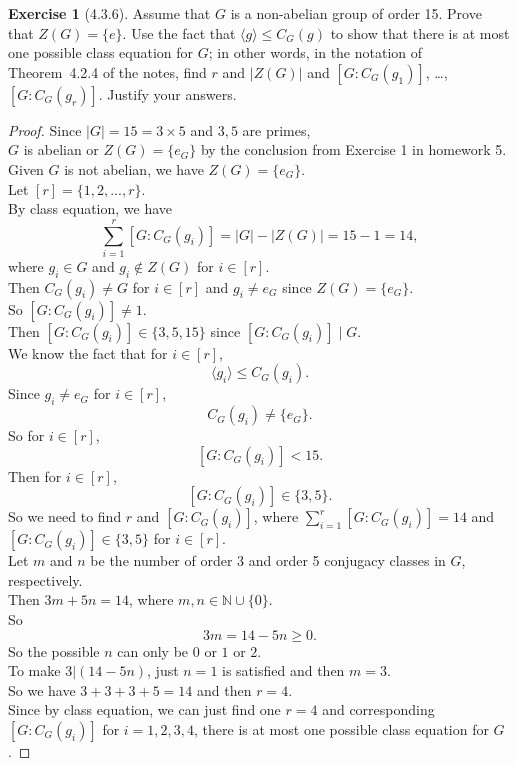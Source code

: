 \documentclass{amsart}
\newcommand{\bbn}{\mathbb{N}}
\theoremstyle{plain}
\theoremstyle{definition}
\newtheorem{exer}[lem]{Exercise}
\begin{document}
\begin{exer}[4.3.6]
Assume that $G$ is a non-abelian group of order 15. 
Prove that $Z(G)=\{e\}$. 
Use the fact that $\langle g\rangle\leq C_G(g)$ to show that there is at most one possible class equation for $G$;
in other words, in the notation of Theorem~4.2.4 of the notes, find $r$ and $|Z(G)|$ and $[G:C_G(g_1)]$, \ldots, $[G:C_G(g_r)]$.
Justify your answers.

\begin{proof}
	Since $|G| = 15 = 3 \times 5$ and $3,5$ are primes, \\
	$G$ is abelian or $Z(G)= \{e_G\}$ by the conclusion from Exercise 1 in homework 5.\\
	Given $G$ is not abelian, we have $Z(G)=\{e_G\}$.\\
	Let $[r] = \{1,2,...,r\}$.\\
	By class equation, we have 
	\[\sum_{i=1}^r [G:C_G(g_i)] = |G|-|Z(G)| = 15-1 = 14,\]
	where $g_i \in G$ and $g_i \not\in Z(G)$ for $i\in [r]$.\\
	Then $C_G(g_i) \neq G$ for $i \in [r]$ and $g_i \neq e_G$ since $Z(G) = \{e_G\}$.\\
	So $[G:C_G(g_i)] \neq 1$.\\
	Then $[G:C_G(g_i)] \in \{3,5,15\}$ since $[G:C_G(g_i)] \mid G$.\\
	We know the fact that for $i \in [r]$, 
  	\[ \langle g_i \rangle \leq C_G(g_i).\]
  	Since $g_i \neq e_G$ for $i \in [r]$,\\
    \[C_G(g_i) \neq \{e_G\}.\]
    So for $i \in [r]$,
    \[[G:C_G(g_i)] < 15.\]
    Then for $i \in [r]$,
    \[[G:C_G(g_i)] \in \{3,5\}.\]
    So we need to find $r$ and $[G:C_G(g_i)]$, where $\sum_{i=1}^r [G:C_G(g_i)] =14$ and $[G:C_G(g_i)] \in \{3,5\}$ for $i \in [r]$.\\
    Let $m$ and $n$ be the number of order 3 and order 5 conjugacy classes in $G$, respectively.\\
    Then $3m+5n =14$, where $m,n \in \bbn \cup \{0\}$.\\
    So
    \[3m = 14-5n \geq 0.\]
    So the possible $n$ can only be $0$ or $1$ or $2$.\\
    To make $3|(14-5n)$, just $n=1$ is satisfied and then $m = 3$.\\
	So we have $3+3+3+5 = 14$ and then $r= 4$.\\ 
    Since by class equation, we can just find one $r=4$ and corresponding $[G:C_G(g_i)]$ for $i = 1,2,3,4$, there is at most one possible class equation for $G$.




\end{proof}

\end{exer}
\end{document}
